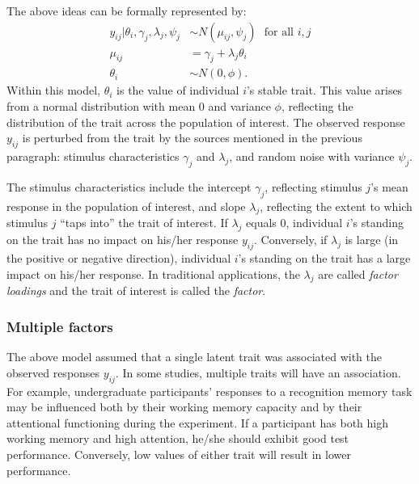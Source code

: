 The above ideas can be formally represented by:
\begin{align} \label{eq:1fac}
    y_{ij} | \theta_i, \gamma_j, \lambda_j, \psi_j &\sim N(\mu_{ij}, \psi_j)\ \ \ \text{for all }i,j \\ \label{eq:1fmn}
    \mu_{ij} &= \gamma_j + \lambda_j \theta_i \\
    \theta_i &\sim N(0, \phi).
\end{align}
Within this model, $\theta_i$ is the value of individual $i$'s stable trait.  This value arises from a normal distribution with mean 0 and variance $\phi$, reflecting the distribution of the trait across the population of interest.  The observed response $y_{ij}$ is perturbed from the trait by the sources mentioned in the previous paragraph: stimulus characteristics $\gamma_j$ and $\lambda_j$, and random noise with variance $\psi_j$.  

The stimulus characteristics include the intercept $\gamma_j$, reflecting stimulus $j$'s mean response in the population of interest, and slope $\lambda_j$, reflecting the extent to which stimulus $j$ ``taps into'' the trait of interest.  If $\lambda_j$ equals 0, individual $i$'s standing on the trait has no impact on his/her response $y_{ij}$.  Conversely, if $\lambda_j$ is large (in the positive or negative direction), individual $i$'s standing on the trait has a large impact on his/her response.  In traditional applications, the $\lambda_j$ are called {\em factor loadings} and the trait of interest is called the {\em factor}.

\subsubsection{Multiple factors}

The above model assumed that a single latent trait was associated with the observed responses $y_{ij}$.  In some studies, multiple traits will have an association.  For example, undergraduate participants' responses to a recognition memory task may be influenced both by their working memory capacity and by their attentional functioning during the experiment.  If a participant has both high working memory and high attention, he/she should exhibit good test performance.  Conversely, low values of either trait will result in lower performance.

